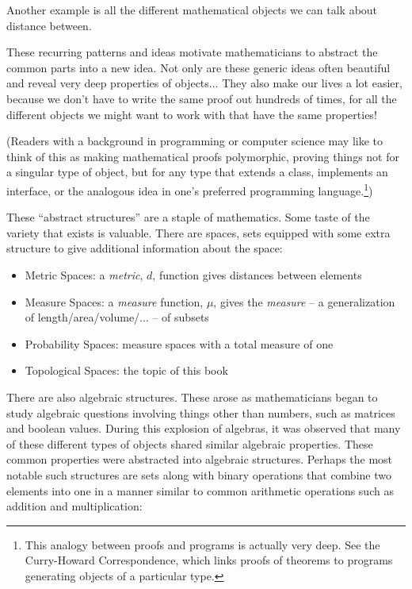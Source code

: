 \documentclass{report}
\begin{document}
Another example is all the different mathematical objects we can talk about distance between.

These recurring patterns and ideas motivate mathematicians to abstract the common parts into a new idea. Not only are these generic ideas often beautiful and reveal very deep properties of objects... They also make our lives a lot easier, because we don't have to write the same proof out hundreds of times, for all the different objects we might want to work with that have the same properties!

(Readers with a background in programming or computer science may like to think of this as making mathematical proofs polymorphic, proving things not for a singular type of object, but for any type that extends a class, implements an interface, or the analogous idea in one's preferred programming language.\footnote{This analogy between proofs and programs is actually very deep. See the Curry-Howard Correspondence, which links proofs of theorems to programs generating objects of a particular type.})

These ``abstract structures'' are a staple of mathematics. Some taste of the variety that exists is valuable. There are spaces, sets equipped with some extra structure to give additional information about the space:

\begin{itemize}
\item Metric Spaces: a \emph{metric}, $d$, function gives distances between elements
\item Measure Spaces: a \emph{measure} function, $\mu$, gives the \emph{measure} -- a generalization of length/area/volume/... -- of subsets
\item Probability Spaces: measure spaces with a total measure of one
\item Topological Spaces: the topic of this book
\end{itemize}

There are also algebraic structures. These arose as mathematicians began to study algebraic questions involving things other than numbers, such as matrices and boolean values. During this explosion of algebras, it was observed that many of these different types of objects shared similar algebraic properties. These common properties were abstracted into algebraic structures. Perhaps the most notable such structures are sets along with binary operations that combine two elements into one in a manner similar to common arithmetic operations such as addition and multiplication:
\end{document}
